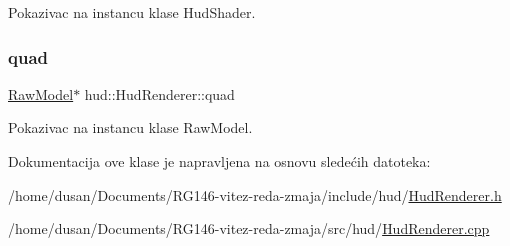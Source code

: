 Pokazivac na instancu klase Hud\+Shader. 

\mbox{\label{classhud_1_1HudRenderer_a322a5afc38f922fbe0f1a6705f8b34ce}} 
\subsubsection{\texorpdfstring{quad}{quad}}
{\footnotesize\ttfamily \hyperlink{classmodel_1_1RawModel}{Raw\+Model}$\ast$ hud\+::\+Hud\+Renderer\+::quad\hspace{0.3cm}{\ttfamily [private]}}



Pokazivac na instancu klase Raw\+Model. 



Dokumentacija ove klase je napravljena na osnovu sledećih datoteka\+:\begin{DoxyCompactItemize}
\item 
/home/dusan/\+Documents/\+R\+G146-\/vitez-\/reda-\/zmaja/include/hud/\hyperlink{HudRenderer_8h}{Hud\+Renderer.\+h}\item 
/home/dusan/\+Documents/\+R\+G146-\/vitez-\/reda-\/zmaja/src/hud/\hyperlink{HudRenderer_8cpp}{Hud\+Renderer.\+cpp}\end{DoxyCompactItemize}
